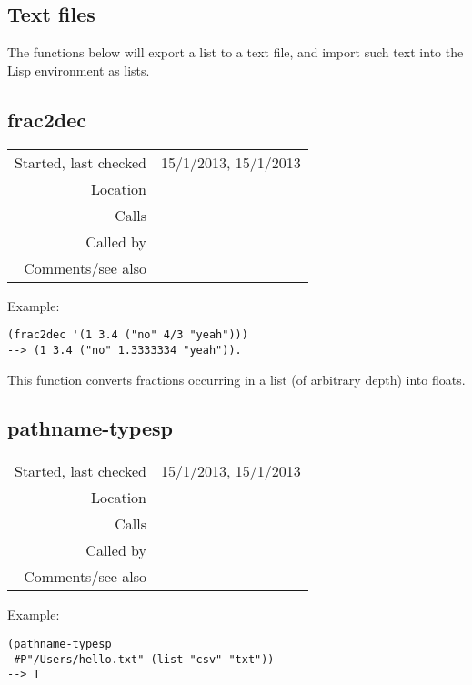 \subsection{Text files}\label{sec:text-files}

The functions below will export a list to a text
file, and import such text into the Lisp
environment as lists.


\subsection*{frac2dec}\label{fun:frac2dec}

\vspace{0.3cm}
\begin{tabular}{r|p{8cm}}
Started, last checked & 15/1/2013, 15/1/2013 \\
Location & \nameref{sec:text-files} \\
Calls & \\
Called by & \\
Comments/see also &
\end{tabular}

\vspace{0.5cm}
\noindent Example:
\begin{verbatim}
(frac2dec '(1 3.4 ("no" 4/3 "yeah")))
--> (1 3.4 ("no" 1.3333334 "yeah")).
\end{verbatim}

\noindent This function converts fractions occurring
in a list (of arbitrary depth) into floats.


\subsection*{pathname-typesp}\label{fun:pathname-typesp}

\vspace{0.3cm}
\begin{tabular}{r|p{8cm}}
Started, last checked & 15/1/2013, 15/1/2013 \\
Location & \nameref{sec:text-files} \\
Calls & \\
Called by & \\
Comments/see also &
\end{tabular}

\vspace{0.5cm}
\noindent Example:
\begin{verbatim}
(pathname-typesp
 #P"/Users/hello.txt" (list "csv" "txt"))
--> T
\end{verbatim}

